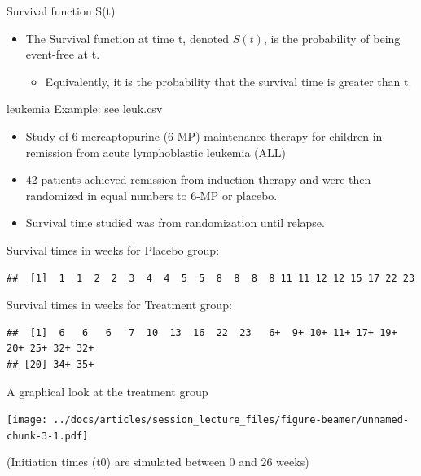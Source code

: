 \documentclass[
  ignorenonframetext,
]{beamer}
\providecommand{\tightlist}{%
  \setlength{\itemsep}{0pt}\setlength{\parskip}{0pt}}
\begin{document}
\begin{frame}{Survival function S(t)}
\protect\hypertarget{survival-function-st}{}

\begin{itemize}
\tightlist
\item
  The Survival function at time t, denoted \(S(t)\), is the probability
  of being event-free at t.

  \begin{itemize}
  \tightlist
  \item
    Equivalently, it is the probability that the survival time is
    greater than t.
  \end{itemize}
\end{itemize}

\end{frame}

\begin{frame}[fragile]{leukemia Example: see leuk.csv}
\protect\hypertarget{leukemia-example-see-leuk.csv}{}

\begin{itemize}
\tightlist
\item
  Study of 6-mercaptopurine (6-MP) maintenance therapy for children in
  remission from acute lymphoblastic leukemia (ALL)
\item
  42 patients achieved remission from induction therapy and were then
  randomized in equal numbers to 6-MP or placebo.
\item
  Survival time studied was from randomization until relapse.
\end{itemize}

Survival times in weeks for Placebo group:

\begin{verbatim}
##  [1]  1  1  2  2  3  4  4  5  5  8  8  8  8 11 11 12 12 15 17 22 23
\end{verbatim}

Survival times in weeks for Treatment group:

\begin{verbatim}
##  [1]  6   6   6   7  10  13  16  22  23   6+  9+ 10+ 11+ 17+ 19+ 20+ 25+ 32+ 32+
## [20] 34+ 35+
\end{verbatim}

\end{frame}

\begin{frame}{A graphical look at the treatment group}
\protect\hypertarget{a-graphical-look-at-the-treatment-group}{}

\texttt{[image: ../docs/articles/session\_lecture\_files/figure-beamer/unnamed-chunk-3-1.pdf]}

(Initiation times (t0) are simulated between 0 and 26 weeks)

\end{frame}
\end{document}
